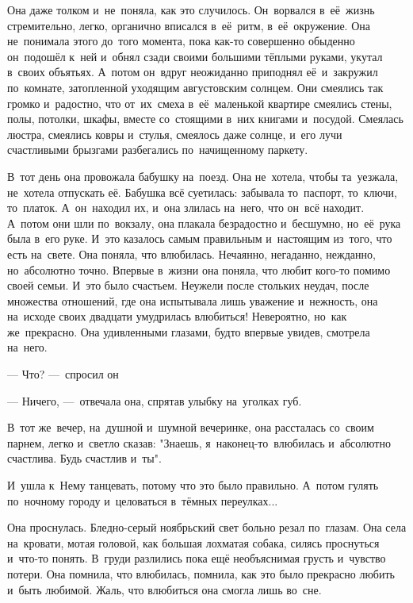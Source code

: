 
\lettrine[lines=3, loversize=0.1]{О}{}на даже толком и~не~поняла, как это случилось.
Он~ворвался в~её~жизнь стремительно, легко, органично вписался в~её~ритм, в~её~окружение.
Она не~понимала этого до~того момента, пока как-то совершенно обыденно он~подошёл к~ней и~обнял сзади своими большими тёплыми руками, укутал в~своих объятьях.
А~потом он~вдруг неожиданно приподнял её~и~закружил по~комнате, затопленной уходящим августовским солнцем.
Они смеялись так громко и~радостно, что от~их~смеха в~её~маленькой квартире смеялись стены, полы, потолки, шкафы, вместе со~стоящими в~них книгами и~посудой.
Смеялась люстра, смеялись ковры и~стулья, смеялось даже солнце, и~его лучи счастливыми брызгами разбегались по~начищенному паркету.
 

В~тот день она провожала бабушку на~поезд.
Она не~хотела, чтобы та~уезжала, не~хотела отпускать её.
Бабушка всё суетилась: забывала то~паспорт, то~ключи, то~платок.
А~он~находил их, и~она злилась на~него, что он~всё находит.
А~потом они шли по~вокзалу, она плакала безрадостно и~бесшумно, но~её~рука была в~его руке.
И~это казалось самым правильным и~настоящим из~того, что есть на~свете.
Она поняла, что влюбилась.
Нечаянно, негаданно, нежданно, но~абсолютно точно.
Впервые в~жизни она поняла, что любит кого-то помимо своей семьи.
И~это было счастьем.
Неужели после стольких неудач, после множества отношений, где она испытывала лишь уважение и~нежность, она на~исходе своих двадцати умудрилась влюбиться! Невероятно, но~как же~прекрасно.
Она удивленными глазами, будто впервые увидев, смотрела на~него.
 
 --- Что? ---~спросил он
 
 --- Ничего, ---~отвечала она, спрятав улыбку на~уголках губ.
 

В~тот же~вечер, на~душной и~шумной вечеринке, она рассталась со~своим парнем, легко и~светло сказав: "Знаешь, я~наконец-то~влюбилась и~абсолютно счастлива.
Будь счастлив и~ты".
 
И~ушла к~Нему танцевать, потому что это было правильно.
А~потом гулять по~ночному городу и~целоваться в~тёмных переулках...

\vspace{10mm}

Она проснулась.
Бледно-серый ноябрьский свет больно резал по~глазам.
Она села на~кровати, мотая головой, как большая лохматая собака, силясь проснуться и~что-то понять.
В~груди разлились пока ещё необъяснимая грусть и~чувство потери.
Она помнила, что влюбилась, помнила, как это было прекрасно любить и~быть любимой.
Жаль, что влюбиться она смогла лишь во~сне.

